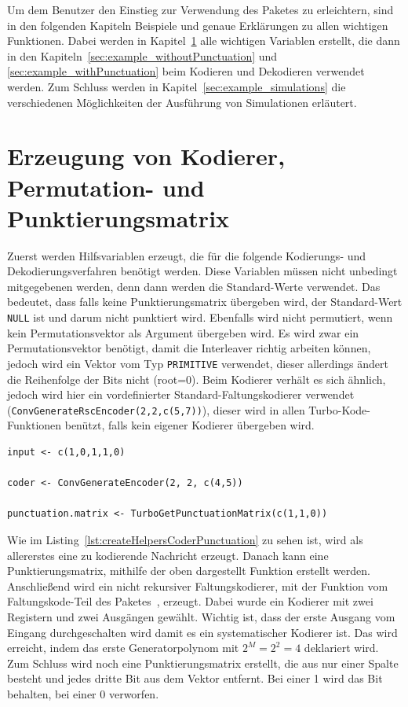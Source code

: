Um dem Benutzer den Einstieg zur Verwendung des Paketes zu erleichtern, sind in den folgenden Kapiteln Beispiele und genaue Erklärungen zu allen wichtigen Funktionen. Dabei werden in Kapitel~\ref{sec:example_createHelpers} alle wichtigen Variablen erstellt, die dann in den Kapiteln~\ref{sec:example_withoutPunctuation} und \ref{sec:example_withPunctuation} beim Kodieren und Dekodieren verwendet werden. Zum Schluss werden in Kapitel~\ref{sec:example_simulations} die verschiedenen Möglichkeiten der Ausführung von Simulationen erläutert.

\section{Erzeugung von Kodierer, Permutation- und Punktierungsmatrix}
\label{sec:example_createHelpers}
Zuerst werden Hilfsvariablen erzeugt, die für die folgende Kodierungs- und Dekodierungsverfahren benötigt werden. Diese Variablen müssen nicht unbedingt mitgegebenen werden, denn dann werden die Standard-Werte verwendet. Das bedeutet, dass falls keine Punktierungsmatrix übergeben wird, der Standard-Wert \texttt{NULL} ist und darum nicht punktiert wird. Ebenfalls wird nicht permutiert, wenn kein Permutationsvektor als Argument übergeben wird. Es wird zwar ein Permutationsvektor benötigt, damit die Interleaver richtig arbeiten können, jedoch wird ein Vektor vom Typ \texttt{PRIMITIVE} verwendet, dieser allerdings ändert die Reihenfolge der Bits nicht (root=0). Beim Kodierer verhält es sich ähnlich, jedoch wird hier ein vordefinierter Standard-Faltungskodierer verwendet (\texttt{ConvGenerateRscEncoder(2,2,c(5,7))}), dieser wird in allen Turbo-Kode-Funktionen benützt, falls kein eigener Kodierer übergeben wird.

\begin{lstlisting}[caption=Erzeugung von Kodierer und Punktierungsmatrix, label={lst:createHelpersCoderPunctuation}, float=!th]
input <- c(1,0,1,1,0)

coder <- ConvGenerateEncoder(2, 2, c(4,5))

punctuation.matrix <- TurboGetPunctuationMatrix(c(1,1,0))
\end{lstlisting}

Wie im Listing~\ref{lst:createHelpersCoderPunctuation} zu sehen ist, wird als allererstes eine zu kodierende Nachricht erzeugt. Danach kann eine Punktierungsmatrix, mithilfe der oben dargestellt Funktion erstellt werden. Anschließend wird ein nicht rekursiver Faltungskodierer, mit der Funktion vom Faltungskode-Teil des Paketes~\cite[S. 55 f.]{nocker}, erzeugt. Dabei wurde ein Kodierer mit zwei Registern und zwei Ausgängen gewählt. Wichtig ist, dass der erste Ausgang vom Eingang durchgeschalten wird damit es ein systematischer Kodierer ist. Das wird erreicht, indem das erste Generatorpolynom mit $2^M = 2^2 = 4$ deklariert wird. Zum Schluss wird noch eine Punktierungsmatrix erstellt, die aus nur einer Spalte besteht und jedes dritte Bit aus dem Vektor entfernt. Bei einer 1 wird das Bit behalten, bei einer 0 verworfen.

